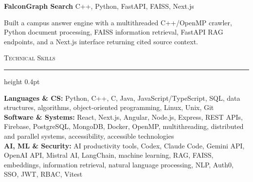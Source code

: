\documentclass[letterpaper,11pt]{article}
\newcommand{\resumesection}[1]{%
  \par\vspace{2pt}%
  {\large\scshape #1}\par\vspace{2pt}%
  \hrule height 0.4pt\vspace{2pt}%
}
\newcommand{\projectHeading}[2]{
  \textbf{#1} \hfill #2
}
\begin{document}
\projectHeading{FalconGraph Search}{C++, Python, FastAPI, FAISS, Next.js}
\begin{tightitemize}
  \item Built a campus answer engine with a multithreaded C++/OpenMP crawler, Python document processing, FAISS information retrieval, FastAPI RAG endpoints, and a Next.js interface returning cited source context.
\end{tightitemize}

\resumesection{Technical Skills}
\textbf{Languages \& CS:} Python, C++, C, Java, JavaScript/TypeScript, SQL, data structures, algorithms, object-oriented programming, Linux, Unix, Git\\
\textbf{Software \& Systems:} React, Next.js, Angular, Node.js, Express, REST APIs, Firebase, PostgreSQL, MongoDB, Docker, OpenMP, multithreading, distributed and parallel systems, accessibility, accessible technologies\\
\textbf{AI, ML \& Security:} AI productivity tools, Codex, Claude Code, Gemini API, OpenAI API, Mistral AI, LangChain, machine learning, RAG, FAISS, embeddings, information retrieval, natural language processing, NLP, Auth0, SSO, JWT, RBAC, Vitest
\end{document}
